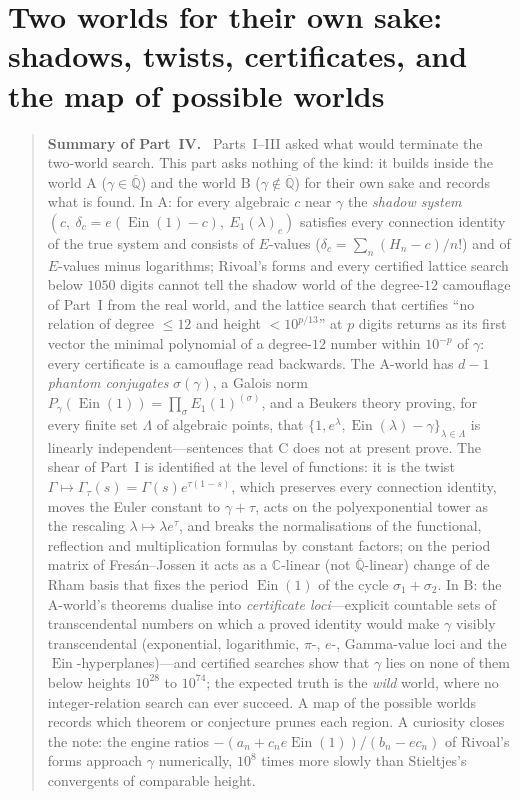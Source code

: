 \documentclass[11pt,a4paper]{article}
\newcommand{\C}{\mathbb C}
\newcommand{\Qbar}{\overline{\mathbb Q}}
\newcommand{\Ein}{\operatorname{Ein}}
\theoremstyle{definition}
\theoremstyle{remark}
\numberwithin{equation}{section}
\newenvironment{partsummary}[1]{\begin{quotation}\small\noindent\textbf{Summary of Part~#1.}\ }{\end{quotation}}
\begin{document}
\part{Two worlds for their own sake: shadows, twists, certificates, and the map of possible worlds}
\begin{partsummary}{IV}
Parts~I--III asked what would terminate the two-world search. This part asks nothing of
the kind: it builds inside the world $\mathrm A$ ($\gamma\in\Qbar$) and the world
$\mathrm B$ ($\gamma\notin\Qbar$) for their own sake and records what is found. In
$\mathrm A$: for every algebraic $c$ near $\gamma$ the \emph{shadow system}
$(c,\ \delta_c=e(\Ein(1)-c),\ E_1(\lambda)_c)$ satisfies every connection identity of the
true system and consists of $E$-values ($\delta_c=\sum_n(H_n-c)/n!$) and of $E$-values minus
logarithms; Rivoal's forms and every certified lattice search below
$1050$ digits cannot tell the shadow world of the degree-$12$ camouflage of Part~I from
the real world, and the lattice search that certifies ``no relation of degree $\le12$ and
height $<10^{p/13}$'' at $p$ digits returns as its first vector the minimal polynomial of
a degree-$12$ number within $10^{-p}$ of $\gamma$: every certificate is a camouflage read
backwards. The $\mathrm A$-world has $d-1$ \emph{phantom conjugates} $\sigma(\gamma)$, a
Galois norm $P_\gamma(\Ein(1))=\prod_\sigma E_1(1)^{(\sigma)}$, and a Beukers theory
proving, for every finite set $\Lambda$ of algebraic points, that
$\{1,e^\lambda,\Ein(\lambda)-\gamma\}_{\lambda\in\Lambda}$ is linearly independent---sentences
that $\mathrm C$ does not at present prove. The shear of Part~I is identified at the level of functions:
it is the twist $\Gamma\mapsto\Gamma_\tau(s)=\Gamma(s)e^{\tau(1-s)}$, which preserves every
connection identity, moves the Euler constant to $\gamma+\tau$, acts on the polyexponential
tower as the rescaling $\lambda\mapsto\lambda e^{\tau}$, and breaks the normalisations of the
functional, reflection and multiplication formulas by constant factors; on the period
matrix of Fres\'an--Jossen it acts as a $\C$-linear (not $\Qbar$-linear) change of de Rham
basis that fixes the period $\Ein(1)$ of the cycle $\sigma_1+\sigma_2$. In $\mathrm B$: the $\mathrm A$-world's theorems dualise into
\emph{certificate loci}---explicit countable sets of transcendental numbers on which a
proved identity would make $\gamma$ visibly transcendental (exponential, logarithmic,
$\pi$-, $e$-, Gamma-value loci and the $\Ein$-hyperplanes)---and certified searches show
that $\gamma$ lies on none of them below heights $10^{28}$ to $10^{74}$; the expected truth
is the \emph{wild} world, where no integer-relation search can ever succeed. A map of the possible worlds
records which theorem or conjecture prunes each region. A curiosity closes the note: the
engine ratios $-(a_n+c_ne\Ein(1))/(b_n-ec_n)$ of Rivoal's forms approach $\gamma$
numerically, $10^{8}$ times more slowly than Stieltjes's convergents of comparable height.
\end{partsummary}
\end{document}
